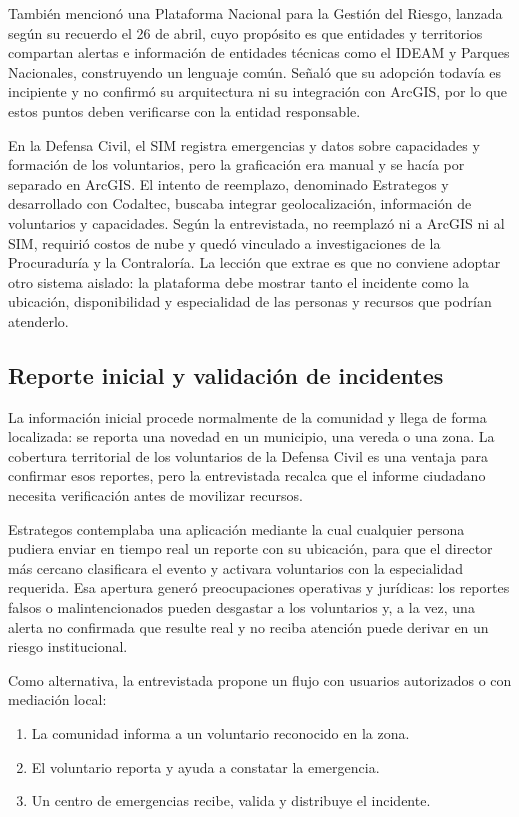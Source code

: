 También mencionó una Plataforma Nacional para la Gestión del Riesgo, lanzada según su recuerdo el 26 de abril, cuyo propósito es que entidades y territorios compartan alertas e información de entidades técnicas como el IDEAM y Parques Nacionales, construyendo un lenguaje común. Señaló que su adopción todavía es incipiente y no confirmó su arquitectura ni su integración con ArcGIS, por lo que estos puntos deben verificarse con la entidad responsable.

En la Defensa Civil, el SIM registra emergencias y datos sobre capacidades y formación de los voluntarios, pero la graficación era manual y se hacía por separado en ArcGIS. El intento de reemplazo, denominado Estrategos y desarrollado con Codaltec, buscaba integrar geolocalización, información de voluntarios y capacidades. Según la entrevistada, no reemplazó ni a ArcGIS ni al SIM, requirió costos de nube y quedó vinculado a investigaciones de la Procuraduría y la Contraloría. La lección que extrae es que no conviene adoptar otro sistema aislado: la plataforma debe mostrar tanto el incidente como la ubicación, disponibilidad y especialidad de las personas y recursos que podrían atenderlo.

\subsection{Reporte inicial y validación de incidentes}

La información inicial procede normalmente de la comunidad y llega de forma localizada: se reporta una novedad en un municipio, una vereda o una zona. La cobertura territorial de los voluntarios de la Defensa Civil es una ventaja para confirmar esos reportes, pero la entrevistada recalca que el informe ciudadano necesita verificación antes de movilizar recursos.

Estrategos contemplaba una aplicación mediante la cual cualquier persona pudiera enviar en tiempo real un reporte con su ubicación, para que el director más cercano clasificara el evento y activara voluntarios con la especialidad requerida. Esa apertura generó preocupaciones operativas y jurídicas: los reportes falsos o malintencionados pueden desgastar a los voluntarios y, a la vez, una alerta no confirmada que resulte real y no reciba atención puede derivar en un riesgo institucional.

Como alternativa, la entrevistada propone un flujo con usuarios autorizados o con mediación local:

\begin{enumerate}
  \item La comunidad informa a un voluntario reconocido en la zona.
  \item El voluntario reporta y ayuda a constatar la emergencia.
  \item Un centro de emergencias recibe, valida y distribuye el incidente.
\end{enumerate}

